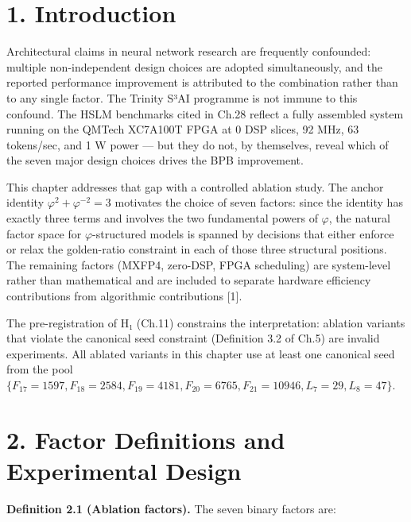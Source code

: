 \section{1. Introduction}\label{fa_17:introduction}

Architectural claims in neural network research
are frequently confounded: multiple
non-independent design choices are adopted
simultaneously, and the reported performance
improvement is attributed to the combination
rather than to any single factor. The Trinity S³AI
programme is not immune to this confound. The HSLM
benchmarks cited in Ch.28 reflect a fully
assembled system running on the QMTech XC7A100T
FPGA at 0 DSP slices, 92 MHz, 63 tokens/sec, and 1
W power --- but they do not, by themselves, reveal
which of the seven major design choices drives the
BPB improvement.

This chapter addresses that gap with a controlled
ablation study. The anchor identity
\(\varphi^2 + \varphi^{-2} = 3\) motivates the
choice of seven factors: since the identity has
exactly three terms and involves the two
fundamental powers of \(\varphi\), the natural
factor space for \(\varphi\)-structured models is
spanned by decisions that either enforce or relax
the golden-ratio constraint in each of those three
structural positions. The remaining factors
(MXFP4, zero-DSP, FPGA scheduling) are
system-level rather than mathematical and are
included to separate hardware efficiency
contributions from algorithmic contributions
[1].

The pre-registration of H₁ (Ch.11) constrains the
interpretation: ablation variants that violate the
canonical seed constraint (Definition 3.2 of Ch.5)
are invalid experiments. All ablated variants in
this chapter use at least one canonical seed from
the pool
\(\{F_{17}=1597, F_{18}=2584, F_{19}=4181, F_{20}=6765, F_{21}=10946, L_7=29, L_8=47\}\).

\section{2. Factor Definitions and Experimental
Design}\label{fa_17:factor-definitions-and-experimental-design}

\textbf{Definition 2.1 (Ablation factors).} The
seven binary factors are:

